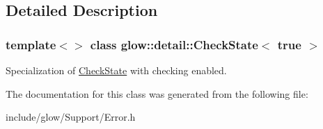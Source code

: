 \subsection{Detailed Description}
\subsubsection*{template$<$$>$\newline
class glow\+::detail\+::\+Check\+State$<$ true $>$}

Specialization of \hyperlink{classglow_1_1detail_1_1_check_state}{Check\+State} with checking enabled. 

The documentation for this class was generated from the following file\+:\begin{DoxyCompactItemize}
\item 
include/glow/\+Support/Error.\+h\end{DoxyCompactItemize}
